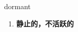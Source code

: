 
\begin{frame}
{\huge dormant}
\begin{center}
\begin{enumerate}\Large
  \item \textbf{静止的，不活跃的}
\end{enumerate}
\end{center}
\end{frame}
